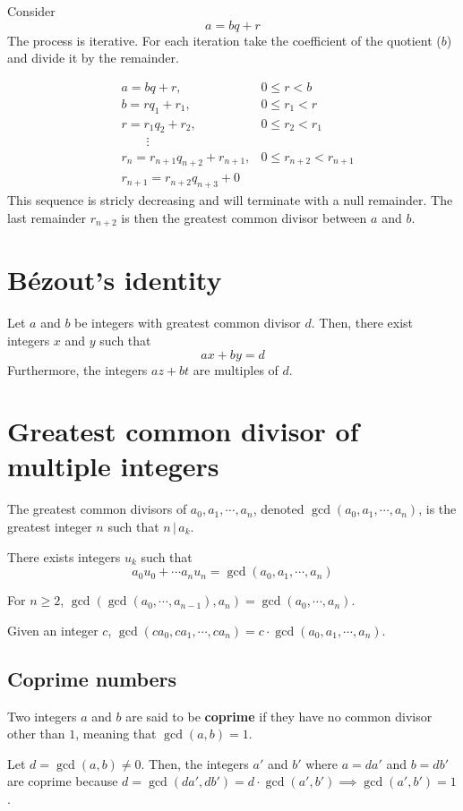 \documentclass[a4paper]{article}
\newcommand{\divides}{\,|\,}
\begin{document}
Consider
\[
    a = bq + r
\]
The process is iterative.
For each iteration take the coefficient of the quotient (\(b\)) and divide it by the remainder.

\begin{align*}
    &a = bq + r, &0 \leq r < b \\
    &b = rq_1 + r_1, &0 \leq r_1 < r \\
    &r = r_1q_2 + r_2, &0 \leq r_2 < r_1 \\
    \phantom{ } &\qquad \vdots & \\
    &r_n = r_{n+1}q_{n+2} + r_{n+1}, &0 \leq r_{n+2} < r_{n+1} \\
    &r_{n+1} = r_{n+2}q_{n+3} + 0&
\end{align*}
This sequence is stricly decreasing and will terminate with a null remainder.
The last remainder \(r_{n+2}\) is then the greatest common divisor between \(a\) and \(b\).

\section{Bézout's identity}

Let \(a\) and \(b\) be integers with greatest common divisor \(d\).
Then, there exist integers \(x\) and \(y\) such that
\[
    ax+by=d
\]
Furthermore, the integers \(az+bt\) are multiples of \(d\).

\section{Greatest common divisor of multiple integers}

The greatest common divisors of \(a_0, a_1, \cdots, a_n\), denoted \(\gcd(a_0, a_1, \cdots, a_n)\),
is the greatest integer \(n\) such that \(n \divides a_k\).

There exists integers \(u_k\) such that
\[
    a_0u_0 + \cdots a_nu_n = \gcd(a_0, a_1, \cdots, a_n)
\]

For \(n \geq 2\), \(\gcd(\gcd(a_0, \cdots, a_{n-1}), a_n) = \gcd(a_0, \cdots, a_n)\).

Given an integer \(c\), \(\gcd(ca_0, ca_1, \cdots, ca_n) = c \cdot \gcd(a_0, a_1, \cdots, a_n)\).



\subsection{Coprime numbers}

Two integers \(a\) and \(b\) are said to be \textbf{coprime}
if they have no common divisor other than \(1\), meaning that \(\gcd(a,b)=1\).

Let \(d = \gcd(a, b) \neq 0\). Then, the integers \(a'\) and \(b'\) where \(a = da'\) and \(b = db'\)
are coprime because \(d = \gcd(da', db') = d\cdot \gcd(a', b') \implies \gcd(a', b') = 1\).

\pagebreak

\end{document}

